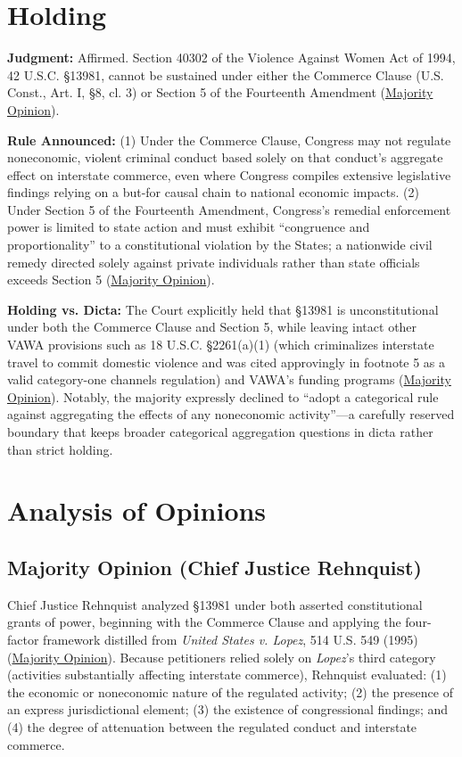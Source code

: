 \documentclass[12pt]{article}
\begin{document}
\section{Holding}
\textbf{Judgment:} Affirmed. Section 40302 of the Violence Against Women Act of 1994, 42 U.S.C. \S 13981, cannot be sustained under either the Commerce Clause (U.S. Const., Art. I, \S 8, cl. 3) or Section 5 of the Fourteenth Amendment (\href{https://www.law.cornell.edu/supct/html/99-5.ZO.html}{Majority Opinion}).

\textbf{Rule Announced:} (1) Under the Commerce Clause, Congress may not regulate noneconomic, violent criminal conduct based solely on that conduct's aggregate effect on interstate commerce, even where Congress compiles extensive legislative findings relying on a but-for causal chain to national economic impacts. (2) Under Section 5 of the Fourteenth Amendment, Congress's remedial enforcement power is limited to state action and must exhibit ``congruence and proportionality'' to a constitutional violation by the States; a nationwide civil remedy directed solely against private individuals rather than state officials exceeds Section 5 (\href{https://www.law.cornell.edu/supct/html/99-5.ZO.html}{Majority Opinion}).

\textbf{Holding vs. Dicta:} The Court explicitly held that \S 13981 is unconstitutional under both the Commerce Clause and Section 5, while leaving intact other VAWA provisions such as 18 U.S.C. \S 2261(a)(1) (which criminalizes interstate travel to commit domestic violence and was cited approvingly in footnote 5 as a valid category-one channels regulation) and VAWA's funding programs (\href{https://www.law.cornell.edu/supct/html/99-5.ZO.html}{Majority Opinion}). Notably, the majority expressly declined to ``adopt a categorical rule against aggregating the effects of any noneconomic activity''---a carefully reserved boundary that keeps broader categorical aggregation questions in dicta rather than strict holding.

\section{Analysis of Opinions}

\subsection{Majority Opinion (Chief Justice Rehnquist)}
Chief Justice Rehnquist analyzed \S 13981 under both asserted constitutional grants of power, beginning with the Commerce Clause and applying the four-factor framework distilled from \textit{United States v. Lopez}, 514 U.S. 549 (1995) (\href{https://www.law.cornell.edu/supct/html/99-5.ZO.html}{Majority Opinion}). Because petitioners relied solely on \textit{Lopez}'s third category (activities substantially affecting interstate commerce), Rehnquist evaluated: (1) the economic or noneconomic nature of the regulated activity; (2) the presence of an express jurisdictional element; (3) the existence of congressional findings; and (4) the degree of attenuation between the regulated conduct and interstate commerce.
\end{document}

